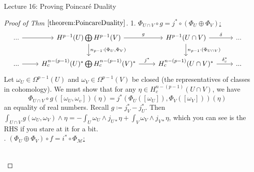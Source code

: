 \documentclass[10pt]{article}
\theoremstyle{plain}
\theoremstyle{definition}
\newcommand{\man}{\mathcal{M}}
\newcommand{\UintV}{U\cap V}
\begin{document}
\begin{section}{Lecture 16: Proving Poincar\'e Duality}
\begin{proof}[Proof of Thm $\ref{theorem:PoincareDuality}$]
1. \underline{$\Phi_{\UintV} \circ g = j^* \circ (\Phi_U \oplus \Phi_V)$:}
$$%
\begin{tikzcd}
... \arrow[r] & H^{p-1}(U)\bigoplus H^{p-1}(V) \arrow[r, "g"] \arrow[d, "{n_{p-1}\cdot(\Phi_U,\Phi_V)}"] & H^{p-1}(U\cap V) \arrow[r, "\delta"] \arrow[d, "n_{p-1}\cdot(\Phi_{U\cap V})"] & ... \\
... \arrow[r] & H^{n-(p-1)}_c(U)^*\bigoplus H^{n-(p-1)}_c(V)^* \arrow[r, "j^*"]                          & H^{n-(p-1)}_c(U\cap V)^* \arrow[r, "\delta_c^*"]                                 & ...
\end{tikzcd}$$
Let $\omega_U \in \Omega^{p-1}(U)$ and $\omega_V \in \Omega^{p-1}(V)$ be closed (the representatives of classes in cohomology). We must show that for any $\eta \in H^{n-(p-1)}_c(\UintV)$, we have 
$$\Phi_{\UintV} \circ g([\omega_U,\omega_v])(\eta) = j^*(\Phi_U([\omega_U]),\Phi_V([\omega_V]))(\eta)$$
an equality of real numbers. Recall $g \coloneqq j_V^* - j_U^*.$ Then $\int_{\UintV} g(\omega_U,\omega_V) \wedge \eta = - \int_U \omega_U\wedge j_{U*} \eta + \int_V \omega_V \wedge j_{V*}\eta$, which you can see is the RHS if you stare at it for a bit.\\
. \underline{$(\Phi_U\oplus\Phi_V) \circ f = i^* \circ \Phi_\man$:}
$$%
\begin{tikzcd}

\end{tikzcd}$$
\end{proof}
\end{section}
\end{document}
